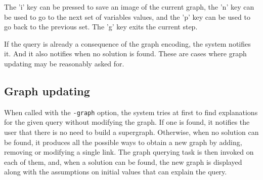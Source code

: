 \documentclass[a4paper]{article}
\begin{document}
The 'i'  key can be pressed to save an image of the current graph,
the 'n'  key can be used to go to the next set of variables values,
 and the 'p'  key can be used to go back to the previous
set. The 'g'  key exits the current step. 

If the query is already a consequence of the graph encoding, the
system notifies it. And it also notifies when no solution is
found. These are cases where graph updating may be reasonably asked for. 


\subsection{Graph updating}

When called with the {\tt -graph} option, the system tries at first to
find explanations for the given query without modifying the graph. If
one is found, it notifies the user that there is no need to build a
supergraph.
Otherwise, when no solution can be found, it produces all the possible
ways to obtain a new graph by adding, removing
or modifying a single link. The graph querying task is then invoked on
each of them, and, when a solution can be found, the new graph is
displayed along with the assumptions on initial values that can
explain the query.
\end{document}
